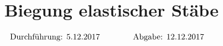 

\subject{v103}
\title{Biegung elastischer Stäbe}

\date{
  \begin{align}
    \text{Durchführung: } & \text{5.12.2017} & \hspace{3em} & \text{Abgabe: 12.12.2017} \notag
  \end{align}
}




\maketitle
\thispagestyle{empty}
\tableofcontents
\newpage
\nocite{*}






\printbibliography{}


